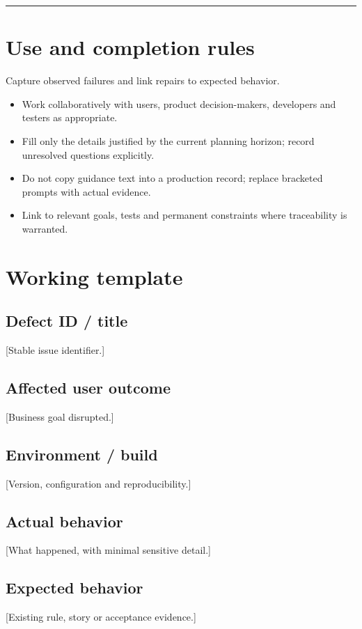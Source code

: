 \documentclass[11pt,letterpaper]{article}
\begin{document}
\tableofcontents\medskip\noindent\rule{\linewidth}{0.4pt}\medskip
\section{Use and completion rules}
Capture observed failures and link repairs to expected behavior.

\begin{itemize}[leftmargin=*,itemsep=2pt]
\item Work collaboratively with users, product decision-makers, developers and testers as appropriate.
\item Fill only the details justified by the current planning horizon; record unresolved questions explicitly.
\item Do not copy guidance text into a production record; replace bracketed prompts with actual evidence.
\item Link to relevant goals, tests and permanent constraints where traceability is warranted.
\end{itemize}
\section{Working template}
\subsection{Defect ID / title}
[Stable issue identifier.]

\subsection{Affected user outcome}
[Business goal disrupted.]

\subsection{Environment / build}
[Version, configuration and reproducibility.]

\subsection{Actual behavior}
[What happened, with minimal sensitive detail.]

\subsection{Expected behavior}
[Existing rule, story or acceptance evidence.]
\end{document}
